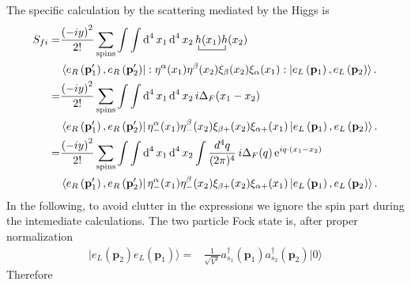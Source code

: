 The specific calculation by the scattering mediated by the Higgs is 
\begin{align}
  S_{fi}=&\frac{\left( -iy \right)^{2}}{2!}\sum_{\text{spins}}\int\int \operatorname{d}^4x_1 \operatorname{d}^4x_2
\bcontraction{\,}{h}{(x_1)}{h}\,h(x_1)h(x_2) \nonumber\\
&\left\langle e_R\left(\mathbf{p}'_1\right), e_R \left(\mathbf{p}'_2\right) \right|
  :\eta^{\alpha}(x_1) \eta^{\beta}(x_2)\xi_{\beta}(x_2) \xi_{\alpha}(x_1):
 \left| e_L \left(\mathbf{p}_1\right), e_L\left(\mathbf{p}_2\right) \right\rangle. \nonumber\\
  =&\frac{\left( -iy \right)^{2}}{2!}\sum_{\text{spins}}\int\int \operatorname{d}^4x_1 \operatorname{d}^4x_2
\,i\Delta_F(x_1-x_2) \nonumber\\
&\left\langle e_R\left(\mathbf{p}'_1\right), e_R \left(\mathbf{p}'_2\right) \right|
  \eta^{\alpha}_{-}(x_1) \eta^{\beta}_{-}(x_2)\xi_{\beta +}(x_2) \xi_{\alpha +}(x_1)
 \left| e_L \left(\mathbf{p}_1\right), e_L\left(\mathbf{p}_2\right) \right\rangle. \nonumber\\
  =&\frac{\left( -iy \right)^{2}}{2!}\sum_{\text{spins}}\int\int \operatorname{d}^4x_1 \operatorname{d}^4x_2
\int\frac{d^4q}{(2\pi)^4}\,i\Delta_F(q)\operatorname{e}^{i q\cdot(x_1-x_2)} \nonumber\\
&\left\langle e_R\left(\mathbf{p}'_1\right), e_R \left(\mathbf{p}'_2\right) \right|
  \eta^{\alpha}_{-}(x_1) \eta^{\beta}_{-}(x_2)\xi_{\beta +}(x_2) \xi_{\alpha +}(x_1)
 \left| e_L \left(\mathbf{p}_1\right), e_L\left(\mathbf{p}_2\right) \right\rangle. 
\end{align}
In the following, to avoid clutter in the expressions we ignore the spin part during the intemediate calculations. 
The two particle Fock state is, after proper normalization
\begin{align}
  |e_L(\mathbf{p}_2)e_L(\mathbf{p}_1)\rangle=&\frac{1}{\sqrt{V^2}}a_{s_1}^\dagger(\mathbf{p}_1)a_{s_2}^\dagger(\mathbf{p}_2)|0\rangle
\end{align}
Therefore %
